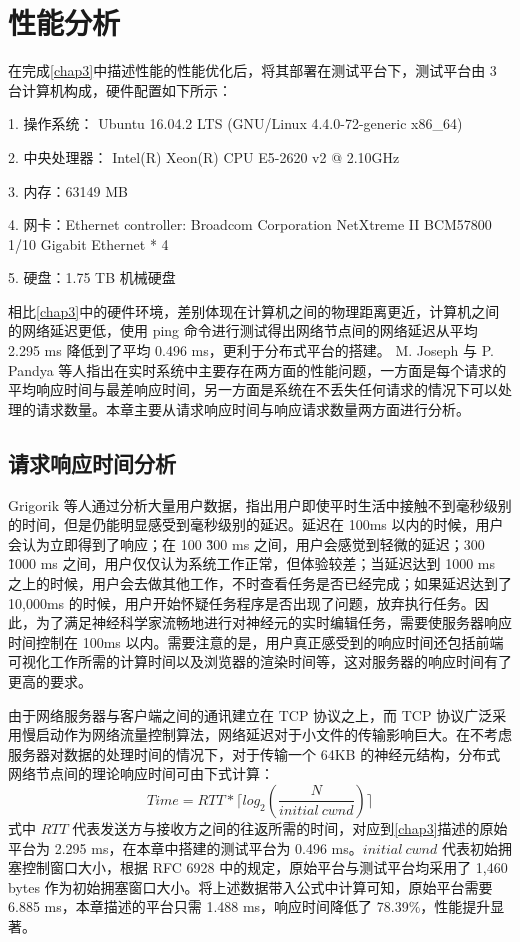 \chapter{性能分析}

在完成\ref{chap3}中描述性能的性能优化后，将其部署在测试平台下，测试平台由 3 台计算机构成，硬件配置如下所示：

1. 操作系统： Ubuntu 16.04.2 LTS (GNU/Linux 4.4.0-72-generic x86\_64)

2. 中央处理器： Intel(R) Xeon(R) CPU E5-2620 v2 @ 2.10GHz

3. 内存：63149 MB

4. 网卡：Ethernet controller: Broadcom Corporation NetXtreme II BCM57800 1/10 Gigabit Ethernet * 4

5. 硬盘：1.75 TB 机械硬盘

相比\ref{chap3}中的硬件环境，差别体现在计算机之间的物理距离更近，计算机之间的网络延迟更低，使用 ping 命令进行测试得出网络节点间的网络延迟从平均 2.295 ms 降低到了平均 0.496 ms，更利于分布式平台的搭建。
M. Joseph 与 P. Pandya 等人指出在实时系统中主要存在两方面的性能问题，一方面是每个请求的平均响应时间与最差响应时间，另一方面是系统在不丢失任何请求的情况下可以处理的请求数量。本章主要从请求响应时间与响应请求数量两方面进行分析。

\section{请求响应时间分析}
Grigorik 等人通过分析大量用户数据，指出用户即使平时生活中接触不到毫秒级别的时间，但是仍能明显感受到毫秒级别的延迟。延迟在 100ms 以内的时候，用户会认为立即得到了响应；在 100 \~ 300 ms 之间，用户会感觉到轻微的延迟；300 \~ 1000 ms 之间，用户仅仅认为系统工作正常，但体验较差；当延迟达到 1000 ms 之上的时候，用户会去做其他工作，不时查看任务是否已经完成；如果延迟达到了 10,000ms 的时候，用户开始怀疑任务程序是否出现了问题，放弃执行任务。因此，为了满足神经科学家流畅地进行对神经元的实时编辑任务，需要使服务器响应时间控制在 100ms 以内。需要注意的是，用户真正感受到的响应时间还包括前端可视化工作所需的计算时间以及浏览器的渲染时间等，这对服务器的响应时间有了更高的要求。

由于网络服务器与客户端之间的通讯建立在 TCP 协议之上，而 TCP 协议广泛采用慢启动作为网络流量控制算法，网络延迟对于小文件的传输影响巨大。在不考虑服务器对数据的处理时间的情况下，对于传输一个 64KB 的神经元结构，分布式网络节点间的理论响应时间可由下式计算：
$$Time=RTT*\lceil log_2(\frac{N}{initial~cwnd}) \rceil$$
式中 $RTT$ 代表发送方与接收方之间的往返所需的时间，对应到\ref{chap3}描述的原始平台为 2.295 ms，在本章中搭建的测试平台为 0.496 ms。$initial~cwnd$ 代表初始拥塞控制窗口大小，根据 RFC 6928 中的规定，原始平台与测试平台均采用了 1,460 bytes 作为初始拥塞窗口大小。将上述数据带入公式中计算可知，原始平台需要 6.885 ms，本章描述的平台只需 1.488 ms，响应时间降低了 78.39\%，性能提升显著。

